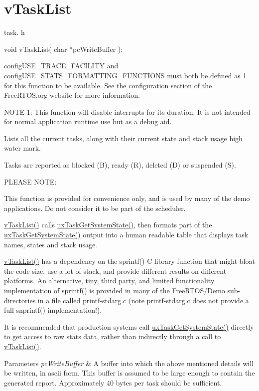 \hypertarget{group__vTaskList}{}\section{v\+Task\+List}
\label{group__vTaskList}
task. h 
\begin{DoxyPre}void vTaskList( char *pcWriteBuffer );\end{DoxyPre}


config\+U\+S\+E\+\_\+\+T\+R\+A\+C\+E\+\_\+\+F\+A\+C\+I\+L\+I\+TY and config\+U\+S\+E\+\_\+\+S\+T\+A\+T\+S\+\_\+\+F\+O\+R\+M\+A\+T\+T\+I\+N\+G\+\_\+\+F\+U\+N\+C\+T\+I\+O\+NS must both be defined as 1 for this function to be available. See the configuration section of the Free\+R\+T\+O\+S.\+org website for more information.

N\+O\+TE 1\+: This function will disable interrupts for its duration. It is not intended for normal application runtime use but as a debug aid.

Lists all the current tasks, along with their current state and stack usage high water mark.

Tasks are reported as blocked (\textquotesingle{}B\textquotesingle{}), ready (\textquotesingle{}R\textquotesingle{}), deleted (\textquotesingle{}D\textquotesingle{}) or suspended (\textquotesingle{}S\textquotesingle{}).

P\+L\+E\+A\+SE N\+O\+TE\+:

This function is provided for convenience only, and is used by many of the demo applications. Do not consider it to be part of the scheduler.

\hyperlink{task_8h_a094a608b1b19b9d3cb41254661653ec2}{v\+Task\+List()} calls \hyperlink{task_8h_ade68760111c37287a3b82c41dff8ec7d}{ux\+Task\+Get\+System\+State()}, then formats part of the \hyperlink{task_8h_ade68760111c37287a3b82c41dff8ec7d}{ux\+Task\+Get\+System\+State()} output into a human readable table that displays task names, states and stack usage.

\hyperlink{task_8h_a094a608b1b19b9d3cb41254661653ec2}{v\+Task\+List()} has a dependency on the sprintf() C library function that might bloat the code size, use a lot of stack, and provide different results on different platforms. An alternative, tiny, third party, and limited functionality implementation of sprintf() is provided in many of the Free\+R\+T\+O\+S/\+Demo sub-\/directories in a file called printf-\/stdarg.\+c (note printf-\/stdarg.\+c does not provide a full snprintf() implementation!).

It is recommended that production systems call \hyperlink{task_8h_ade68760111c37287a3b82c41dff8ec7d}{ux\+Task\+Get\+System\+State()} directly to get access to raw stats data, rather than indirectly through a call to \hyperlink{task_8h_a094a608b1b19b9d3cb41254661653ec2}{v\+Task\+List()}.


\begin{DoxyParams}{Parameters}
{\em pc\+Write\+Buffer} & A buffer into which the above mentioned details will be written, in ascii form. This buffer is assumed to be large enough to contain the generated report. Approximately 40 bytes per task should be sufficient. \\
\hline
\end{DoxyParams}
